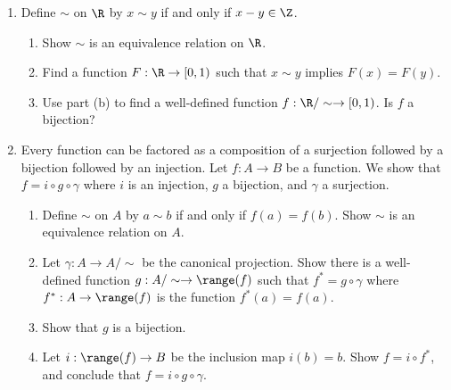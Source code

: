 \begin{enumerate}
\item Define $\sim$ on $\R$ by $x \sim y$ if and only if $x - y \in \Z$. 
\begin{enumerate}
    \item Show $\sim$ is an equivalence relation on $\R$.
    \item Find a function $F : \R \to [0,1)$ such that $x \sim y$ implies $F(x) = F(y)$.
    \item Use part (b) to find a well-defined function $f : \R / \sim \to [0,1)$. Is $f$ a bijection?
\end{enumerate}

\item Every function can be factored as a composition of a surjection followed by a bijection followed by an injection. Let $f : A \to B$ be a function. We show that $f = i \circ g \circ \gamma$ where $i$ is an injection, $g$ a bijection, and $\gamma$ a surjection.
\begin{enumerate}
    \item Define $\sim$ on $A$ by $a \sim b$ if and only if $f(a) = f(b)$. Show $\sim$ is an equivalence relation on $A$.
    \item Let $\gamma : A \to A/\sim$ be the canonical projection. Show there is a well-defined function $g : A/\sim \to \range(f)$ such that $f^* = g \circ \gamma$ where $f^* : A \to \range(f)$ is the function $f^*(a) = f(a)$.
    \item Show that $g$ is a bijection.
    \item Let $i : \range(f) \to B$ be the inclusion map $i(b) = b$. Show $f = i \circ f^*$, and conclude that $f = i \circ g \circ \gamma$.
\end{enumerate}
\end{enumerate}

